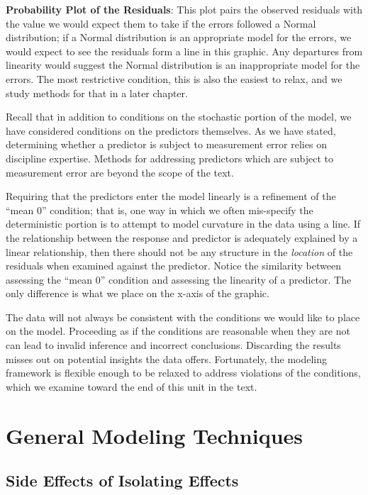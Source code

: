 \documentclass[
]{book}
\theoremstyle{plain}
\theoremstyle{mydefn}
\theoremstyle{myexmpl}
\theoremstyle{remark}
\begin{document}
\textbf{Probability Plot of the Residuals}: This plot pairs the observed residuals with the value we would expect them to take if the errors followed a Normal distribution; if a Normal distribution is an appropriate model for the errors, we would expect to see the residuals form a line in this graphic. Any departures from linearity would suggest the Normal distribution is an inappropriate model for the errors. The most restrictive condition, this is also the easiest to relax, and we study methods for that in a later chapter.

Recall that in addition to conditions on the stochastic portion of the model, we have considered conditions on the predictors themselves. As we have stated, determining whether a predictor is subject to measurement error relies on discipline expertise. Methods for addressing predictors which are subject to measurement error are beyond the scope of the text.

Requiring that the predictors enter the model linearly is a refinement of the ``mean 0'' condition; that is, one way in which we often mis-specify the deterministic portion is to attempt to model curvature in the data using a line. If the relationship between the response and predictor is adequately explained by a linear relationship, then there should not be any structure in the \emph{location} of the residuals when examined against the predictor. Notice the similarity between assessing the ``mean 0'' condition and assessing the linearity of a predictor. The only difference is what we place on the x-axis of the graphic.

The data will not always be consistent with the conditions we would like to place on the model. Proceeding as if the conditions are reasonable when they are not can lead to invalid inference and incorrect conclusions. Discarding the results misses out on potential insights the data offers. Fortunately, the modeling framework is flexible enough to be relaxed to address violations of the conditions, which we examine toward the end of this unit in the text.

\hypertarget{part-general-modeling-techniques}{%
\part{General Modeling Techniques}\label{part-general-modeling-techniques}}

\hypertarget{glm-related-predictors}{%
\chapter{Side Effects of Isolating Effects}\label{glm-related-predictors}}
\end{document}
